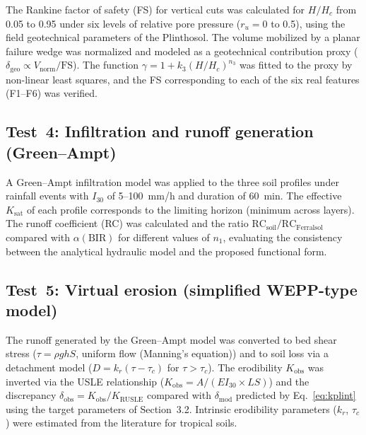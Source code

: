 \documentclass[preprint,review,12pt,authoryear]{elsarticle}
\begin{document}
The Rankine factor of safety (FS) \citep{rankine_1857} for vertical cuts was calculated for $H/H_c$ from 0.05 to 0.95 under six levels of relative pore pressure ($r_u = 0$ to 0.5), using the field geotechnical parameters of the Plinthosol. The volume mobilized by a planar failure wedge was normalized and modeled as a geotechnical contribution proxy ($\delta_{\mathrm{geo}} \propto V_{\mathrm{norm}}/\mathrm{FS}$). The function $\gamma = 1 + k_3(H/H_c)^{n_3}$ was fitted to the proxy by non-linear least squares, and the FS corresponding to each of the six real features (F1--F6) was verified.

\subsection{Test~4: Infiltration and runoff generation (Green--Ampt)}

A Green--Ampt infiltration model \citep{green_ampt_1911} was applied to the three soil profiles under rainfall events with $I_{30}$ of 5--100~mm/h and duration of 60~min. The effective $K_{\mathrm{sat}}$ of each profile corresponds to the limiting horizon (minimum across layers). The runoff coefficient (RC) was calculated and the ratio $\mathrm{RC}_{\mathrm{soil}}/\mathrm{RC}_{\mathrm{Ferralsol}}$ compared with $\alpha(\mathrm{BIR})$ for different values of $n_1$, evaluating the consistency between the analytical hydraulic model and the proposed functional form.

\subsection{Test~5: Virtual erosion (simplified WEPP-type model)}

The runoff generated by the Green--Ampt model was converted to bed shear stress ($\tau = \rho g h S$, uniform flow (Manning's equation)) and to soil loss via a detachment model ($D = k_r(\tau - \tau_c)$ for $\tau > \tau_c$). The erodibility $K_{\mathrm{obs}}$ was inverted via the USLE relationship ($K_{\mathrm{obs}} = A/(EI_{30} \times LS)$) and the discrepancy $\delta_{\mathrm{obs}} = K_{\mathrm{obs}}/K_{\mathrm{RUSLE}}$ compared with $\delta_{\mathrm{mod}}$ predicted by Eq.~\ref{eq:kplint} using the target parameters of Section~3.2. Intrinsic erodibility parameters ($k_r$, $\tau_c$) were estimated from the literature for tropical soils.

\end{document}

